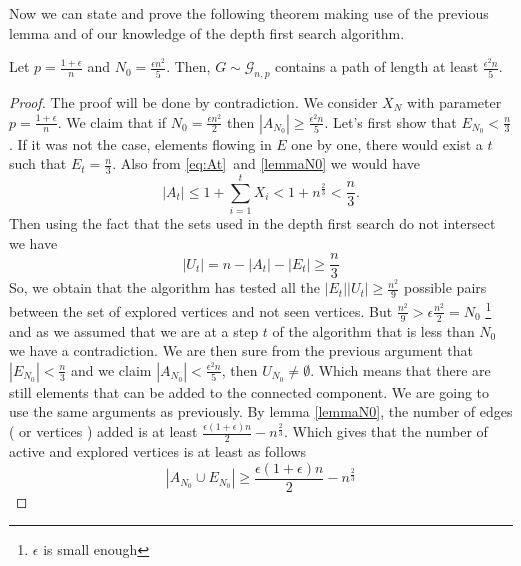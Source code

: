Now we can state and prove the following theorem making use of the previous lemma and of our knowledge of the depth first search algorithm.
\begin{theorem}
	Let $p = \frac{1+\epsilon}{n}$ and $N_0 = \frac{\epsilon n^2}{5}$. Then, $G \sim \mathcal{G}_{n,p}$ contains a path of length at least $\frac{\epsilon^2n}{5}$.
\end{theorem}
\begin{proof}
	The proof will be done by contradiction.
	\newline
	We consider $X_N$ with parameter $p = \frac{1+\epsilon}{n}$. We claim that if $N_0 = \frac{\epsilon n^2}{2}$ then $|A_{N_0}| \geq \frac{\epsilon^2 n}{5}$.
	\newline
	Let's first show that $E_{N_0} < \frac{n}{3}$.
	\newline
	If it was not the case, elements flowing in $E$ one by one, there would exist a $t$ such that $E_t = \frac{n}{3}$. Also from \eqref{eq:At} and \eqref{lemmaN0} we would have
	\begin{equation}
		|A_t| \leq 1 + \sum_{i=1}^{t} X_i < 1 + n^{\frac{2}{3}} < \frac{n}{3}.
	\end{equation}
	Then using the fact that the sets used in the depth first search do not intersect we have
	\begin{equation}
		|U_t| = n - |A_t| - |E_t| \geq \frac{n}{3}
	\end{equation}
	So, we obtain that the algorithm has tested all the $|E_t||U_t| \geq \frac{n^2}{9}$ possible pairs between the set of explored vertices and not seen vertices.
	But $\frac{n^2}{9} > \epsilon\frac{n^2}{2} = N_0$ \footnote{ $\epsilon$ is small enough} and as we assumed that we are at a step $t$ of the algorithm that is less than $N_0$ we have a contradiction. 
	\newline
	We are then sure from the previous argument that $|E_{N_0}| < \frac{n}{3}$ and we claim $|A_{N_0}| < \frac{\epsilon^2 n}{5}$, then $U_{N_0} \neq \emptyset$. 
	Which means that there are still elements that can be added to the connected component.
	We are going to use the same arguments as previously.
	\newline
	By lemma \ref{lemmaN0}, the number of edges ( or vertices ) added is at least $\frac{\epsilon(1+\epsilon)n}{2} - n^{\frac{2}{3}}$.
	Which gives that the number of active and explored vertices is at least as follows
	\begin{equation}
		|A_{N_0} \cup E_{N_0}| \geq \frac{\epsilon(1+\epsilon)n}{2} - n^{\frac{2}{3}}
	\end{equation}

\end{proof}
